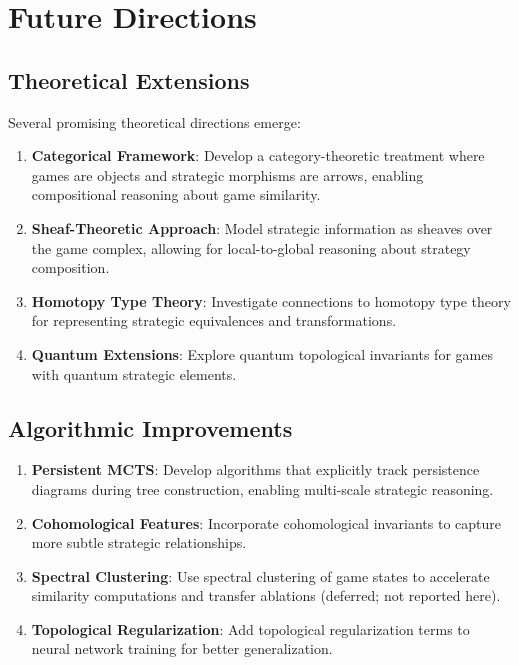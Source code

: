 \documentclass{article}
\begin{document}
\section{Future Directions}

\subsection{Theoretical Extensions}

Several promising theoretical directions emerge:

\begin{enumerate}
\item \textbf{Categorical Framework}: Develop a category-theoretic treatment where games are objects and strategic morphisms are arrows, enabling compositional reasoning about game similarity.

\item \textbf{Sheaf-Theoretic Approach}: Model strategic information as sheaves over the game complex, allowing for local-to-global reasoning about strategy composition.

\item \textbf{Homotopy Type Theory}: Investigate connections to homotopy type theory for representing strategic equivalences and transformations.

\item \textbf{Quantum Extensions}: Explore quantum topological invariants for games with quantum strategic elements.
\end{enumerate}

\subsection{Algorithmic Improvements}

\begin{enumerate}
\item \textbf{Persistent MCTS}: Develop algorithms that explicitly track persistence diagrams during tree construction, enabling multi-scale strategic reasoning.

\item \textbf{Cohomological Features}: Incorporate cohomological invariants to capture more subtle strategic relationships.

\item \textbf{Spectral Clustering}: Use spectral clustering of game states to accelerate similarity computations and transfer ablations (deferred; not reported here).

\item \textbf{Topological Regularization}: Add topological regularization terms to neural network training for better generalization.
\end{enumerate}
\end{document}
